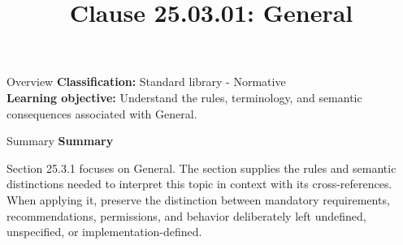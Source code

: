 \documentclass[10pt,letterpaper]{article}
\title{Clause 25.03.01: General}
\author{}
\date{}
\begin{document}
\maketitle
\begin{CornellOverviewBox}{Overview}
\textbf{Classification:} Standard library - Normative\\[2pt]
\textbf{Learning objective:} Understand the rules, terminology, and semantic consequences associated with General.
\end{CornellOverviewBox}\begin{CornellSummaryBox}{Summary}
{\sffamily\bfseries\color{Accent} Summary}\par\vspace{3pt}Section 25.3.1 focuses on General. The section supplies the rules and semantic distinctions needed to interpret this topic in context with its cross-references. When applying it, preserve the distinction between mandatory requirements, recommendations, permissions, and behavior deliberately left undefined, unspecified, or implementation-defined.
\end{CornellSummaryBox}
\end{document}
